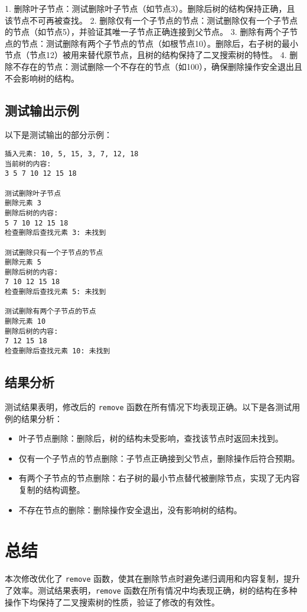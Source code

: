 \documentclass{article}
\begin{document}
1. 删除叶子节点：测试删除叶子节点（如节点3）。删除后树的结构保持正确，且该节点不可再被查找。
2. 删除仅有一个子节点的节点：测试删除仅有一个子节点的节点（如节点5），并验证其唯一子节点正确连接到父节点。
3. 删除有两个子节点的节点：测试删除有两个子节点的节点（如根节点10）。删除后，右子树的最小节点（节点12）被用来替代原节点，且树的结构保持了二叉搜索树的特性。
4. 删除不存在的节点：测试删除一个不存在的节点（如100），确保删除操作安全退出且不会影响树的结构。

\subsection{测试输出示例}
以下是测试输出的部分示例：

\begin{verbatim}
插入元素: 10, 5, 15, 3, 7, 12, 18
当前树的内容:
3 5 7 10 12 15 18

测试删除叶子节点
删除元素 3
删除后树的内容:
5 7 10 12 15 18
检查删除后查找元素 3: 未找到

测试删除只有一个子节点的节点
删除元素 5
删除后树的内容:
7 10 12 15 18
检查删除后查找元素 5: 未找到

测试删除有两个子节点的节点
删除元素 10
删除后树的内容:
7 12 15 18
检查删除后查找元素 10: 未找到
\end{verbatim}

\subsection{结果分析}
测试结果表明，修改后的 \texttt{remove} 函数在所有情况下均表现正确。以下是各测试用例的结果分析：

\begin{itemize}
    \item 叶子节点删除：删除后，树的结构未受影响，查找该节点时返回未找到。
    \item 仅有一个子节点的节点删除：子节点正确接到父节点，删除操作后符合预期。
    \item 有两个子节点的节点删除：右子树的最小节点替代被删除节点，实现了无内容复制的结构调整。
    \item 不存在节点的删除：删除操作安全退出，没有影响树的结构。
\end{itemize}

\section{总结}
本次修改优化了 \texttt{remove} 函数，使其在删除节点时避免递归调用和内容复制，提升了效率。测试结果表明，\texttt{remove} 函数在所有情况中均表现正确，树的结构在多种操作下均保持了二叉搜索树的性质，验证了修改的有效性。
\end{document}

